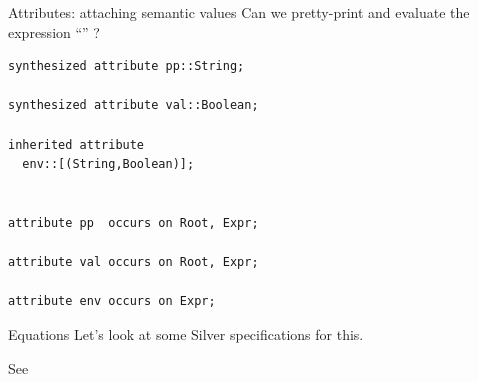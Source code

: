 \documentclass[11pt,aspectratio=169]{beamer}
\newcommand{\ys}{1.3}
\newcommand{\enve}[2]{\draw[blue] ($(#1-0.4,\ys*#2-0.35)$) circle(0.15);}
\newcommand{\envd}[2]{\filldraw[blue] ($(#1-0.4,\ys*#2-0.35)$) circle(0.05);}
\newcommand{\envc}[2]{\filldraw[blue] ($(#1-0.4,\ys*#2-0.35)$) circle(0.15);}
\newcommand{\ppe}[2]{\draw[dgreen] ($(#1+0.4,\ys*#2-0.35)$) circle(0.15);}
\newcommand{\ppd}[2]{\filldraw[dgreen] ($(#1+0.4,\ys*#2-0.35)$) circle(0.05);}
\newcommand{\ppc}[2]{\filldraw[dgreen] ($(#1+0.4,\ys*#2-0.35)$) circle(0.15);}
\newcommand{\vale}[2]{\draw[red] ($(#1+0.8,\ys*#2-0.35)$) circle(0.15);}
\newcommand{\vald}[2]{\filldraw[red] ($(#1+0.8,\ys*#2-0.35)$) circle(0.05);}
\newcommand{\valc}[2]{\filldraw[red] ($(#1+0.8,\ys*#2-0.35)$) circle(0.15);}
\newcommand{\erre}[2]{\draw[orange] ($(#1+1.2,\ys*#2-0.35)$) circle(0.15);}
\newcommand{\rtn}[3]{
\draw ($(#1,#2*\ys)$) node{#3};
\ppe{#1}{#2}
\vale{#1}{#2}

\draw[gray] ($(#1+0.65,\ys*#2+0.25)$) --
            ($(#1-0.3,\ys*#2+0.25)$) arc (90:270:4.5mm);

\draw[gray] ($(#1+0.65,\ys*#2+0.25)$) arc (90:-90:4.5mm) -- 
            ($(#1-0.3,\ys*#2-0.65)$) ;
}
\newcommand{\tn}[3]{
\rtn{#1}{#2}{#3}
\enve{#1}{#2}
}
\newcommand{\tnstr}[3]{
\draw ($(#1,#2*\ys)$) node{#3};
\draw[gray] ($(#1+0.25,\ys*#2+0.25)$) --
            ($(#1-0.2,\ys*#2+0.25)$) arc (90:270:2.5mm);

\draw[gray] ($(#1+0.25,\ys*#2+0.25)$) arc (90:-90:2.5mm) -- 
            ($(#1-0.2,\ys*#2-0.25)$) ;

}
\newcommand{\tedge}[4]{
\draw[gray] ($(#1+\xsh,\ys*#2-0.65)$) -- ($(#3+\xsh,\ys*#4+0.25)$);
}
\newcommand{\ppeval}{
\pause
\ppd{4}{4} %
\pause
\ppd{4}{3} %

\pause
\ppd{4}{2} %
\pause
\ppc{4}{2} %
\pause
\ppd{6.5}{2}  %

\pause
\ppd{5.25}{1} %
\pause
\ppc{5.25}{1} %
\pause
\ppd{7.75}{1} %
\pause
\ppc{7.75}{1} %

\pause
\ppc{6.5}{2}  %

\pause
\ppc{4}{3} %

\pause
\ppc{4}{4} %
}
\newcommand{\valeval}{
\pause\vald{4}{4} %
\pause\vald{4}{3} %

\pause\vald{6.5}{2}  %
\pause\vald{5.25}{1} %
\pause\valc{5.25}{1} %

\pause\vald{7.75}{1} %

\pause\envd{7.75}{1} %

\pause\envd{6.5}{2}  %

\pause
\draw ($(5.5,\ys*-0.5)$) node {\small\texttt{body.env = addEnv(name, dval.val, e.env);}};

\pause\vald{4}{2} %
\pause\valc{4}{2} %

\pause\envd{4}{3} %
\pause\envc{4}{3} %

\pause\envc{6.5}{2}  %

\pause
\draw[white] ($(5.5,\ys*-0.5)$) node {\small\texttt{body.env = addEnv(name, dval.val, e.env);}};

\pause\envc{7.75}{1} %

\pause\valc{7.75}{1} %
\pause\valc{6.5}{2}  %

\pause\valc{4}{3} %

\pause\valc{4}{4} %
}
\newcommand{\xsh}{0.15}
\begin{document}
\begin{frame}[t,fragile]{Attributes: attaching semantic values}
Can we pretty-print and evaluate the expression
``'' ?

\bigskip

\begin{minipage}[t]{2.9in}
\vspace{0pt}
\end{minipage}
\begin{minipage}[t]{2.1in}
\vspace{0pt}
\small
\begin{verbatim}
synthesized attribute pp::String;

synthesized attribute val::Boolean;

inherited attribute 
  env::[(String,Boolean)];


attribute pp  occurs on Root, Expr;

attribute val occurs on Root, Expr;

attribute env occurs on Expr;
\end{verbatim}
\end{minipage}

\end{frame}

\begin{frame}{Equations}
Let's look at some Silver specifications for this.

\bigskip
See 
\end{frame}
\end{document}
